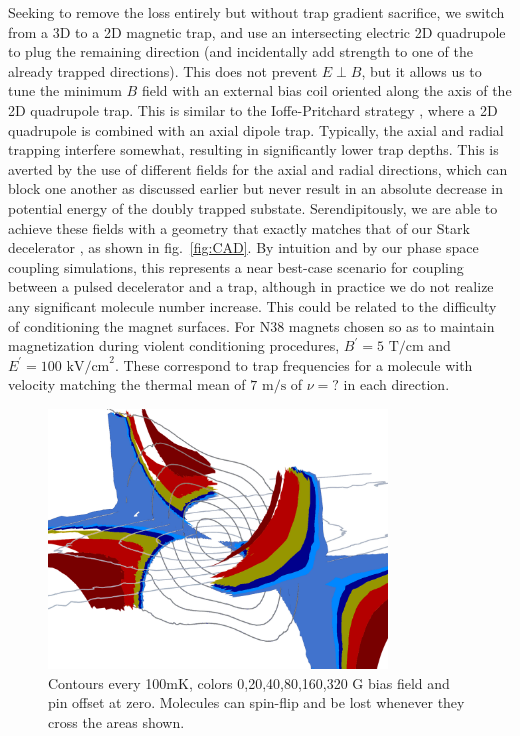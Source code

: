\documentclass[%
 reprint,
 amsmath,amssymb,
 aps,
prl,
]{revtex4-1}
\begin{document}
Seeking to remove the loss entirely but without trap gradient sacrifice, we switch from a 3D to a 2D magnetic trap, and use an intersecting electric 2D quadrupole to plug the remaining direction (and incidentally add strength to one of the already trapped directions). This does not prevent $E\!\perp\! B$, but it allows us to tune the minimum $B$ field with an external bias coil oriented along the axis of the 2D quadrupole trap. This is similar to the Ioffe-Pritchard strategy \cite{ref:iptrap}, where a 2D quadrupole is combined with an axial dipole trap. Typically, the axial and radial trapping interfere somewhat, resulting in significantly lower trap depths. This is averted by the use of different fields for the axial and radial directions, which can block one another as discussed earlier but never result in an absolute decrease in potential energy of the doubly trapped substate. Serendipitously, we are able to achieve these fields with a geometry that exactly matches that of our Stark decelerator \cite{Bochinski2003}, as shown in fig.~\ref{fig:CAD}. By intuition and by our phase space coupling simulations, this represents a near best-case scenario for coupling between a pulsed decelerator and a trap, although in practice we do not realize any significant molecule number increase. This could be related to the difficulty of conditioning the magnet surfaces. For N38 magnets chosen so as to maintain magnetization during violent conditioning procedures, $B^\prime=5\text{ T/cm}$ and $E^\prime=100 \text{ kV/cm}^2$. These correspond to trap frequencies for a molecule with velocity matching the thermal mean of $7 \text{ m/s}$ of $\nu=?$ in each direction.

\begin{figure}
\includegraphics[width=90mm]{Loss_Surface_Chunks_recolored.png}%
\caption{
Contours every 100mK, colors 0,20,40,80,160,320 G bias field and pin offset at zero. Molecules can spin-flip and be lost whenever they cross the areas shown.
\label{fig:LSurfs}}
\end{figure}
\end{document}
